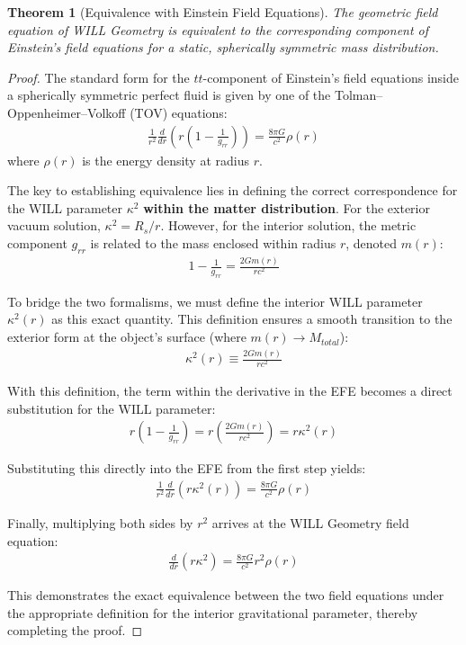 \documentclass[12pt, a4paper]{article}
\newtheorem{theorem}{Theorem}[section]
\begin{document}
\begin{theorem}[Equivalence with Einstein Field Equations]
The geometric field equation of WILL Geometry is equivalent to the corresponding component of Einstein's field equations for a static, spherically symmetric mass distribution.
\end{theorem}

\begin{proof}
The standard form for the $tt$-component of Einstein's field equations inside a spherically symmetric perfect fluid is given by one of the Tolman--Oppenheimer--Volkoff (TOV) equations:
\begin{align}
\frac{1}{r^2}\frac{d}{dr}\left(r\left(1-\frac{1}{g_{rr}}\right)\right) = \frac{8\pi G}{c^2}\rho(r)
\end{align}
where $\rho(r)$ is the energy density at radius $r$.

The key to establishing equivalence lies in defining the correct correspondence for the WILL parameter $\kappa^2$ \textbf{within the matter distribution}. For the exterior vacuum solution, $\kappa^2 = R_s/r$. However, for the interior solution, the metric component $g_{rr}$ is related to the mass enclosed within radius $r$, denoted $m(r)$:
\begin{align}
1 - \frac{1}{g_{rr}} = \frac{2Gm(r)}{rc^2}
\end{align}

To bridge the two formalisms, we must define the interior WILL parameter $\kappa^2(r)$ as this exact quantity. This definition ensures a smooth transition to the exterior form at the object's surface (where $m(r) \to M_{total}$):
\begin{align}
\kappa^2(r) \equiv \frac{2Gm(r)}{rc^2}
\end{align}

With this definition, the term within the derivative in the EFE becomes a direct substitution for the WILL parameter:
\begin{align}
r\left(1 - \frac{1}{g_{rr}}\right) = r \left( \frac{2Gm(r)}{rc^2} \right) = r \kappa^2(r)
\end{align}

Substituting this directly into the EFE from the first step yields:
\begin{align}
\frac{1}{r^2}\frac{d}{dr}\left(r\kappa^2(r)\right) = \frac{8\pi G}{c^2}\rho(r)
\end{align}

Finally, multiplying both sides by $r^2$ arrives at the WILL Geometry field equation:
\begin{align}
\frac{d}{dr}\left(r\kappa^2\right) = \frac{8\pi G}{c^2}r^2\rho(r)
\end{align}

This demonstrates the exact equivalence between the two field equations under the appropriate definition for the interior gravitational parameter, thereby completing the proof.
\end{proof}
\end{document}
